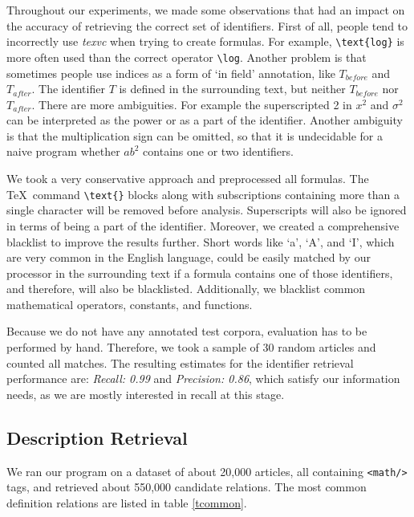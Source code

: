 \documentclass[runningheads]{llncs}
\begin{document}
Throughout our experiments, we made some observations that had an impact on the
accuracy of retrieving the correct set of identifiers. First of all, people
tend to incorrectly use \emph{texvc} when trying to create formulas. For example,
\texttt{\textbackslash text\{log\}} is more often used than the correct
operator \texttt{\textbackslash log}. Another problem is that sometimes people
use indices as a form of `in field' annotation, like $T_{before}$ and
$T_{after}$. The identifier $T$ is defined in the surrounding text, but
neither $T_{before}$ nor $T_{after}$. There are more ambiguities. For example
the superscripted 2 in $x^{2}$ and $\sigma^{2}$ can be interpreted as the
power or as a part of the identifier. Another ambiguity is that the
multiplication sign can be omitted, so that it is undecidable for a naive
program whether $ab^{2}$ contains one or two identifiers.

We took a very conservative approach and preprocessed all formulas.
The \TeX~command \texttt{\textbackslash text\{\}} blocks along with subscriptions containing
more than a single character will be removed before analysis. Superscripts
will also be ignored in terms of being a part of the identifier. Moreover, we
created a comprehensive blacklist to improve the results further. Short words
like `a', `A', and `I', which are very common in the English language, could be
easily matched by our processor in the surrounding text if a formula contains
one of those identifiers, and therefore, will also be blacklisted. Additionally,
we blacklist common mathematical operators, constants, and functions.

Because we do not have any annotated test corpora, evaluation has to be
performed by hand. Therefore, we took a sample of 30 random articles and
counted all matches. The resulting estimates for the identifier retrieval
performance are: \emph{Recall: 0.99} and \emph{Precision: 0.86}, which satisfy
our information needs, as we are mostly interested in recall at this stage.


\subsection{Description Retrieval}
We ran our program on a dataset of about 20,000 articles, all containing
\texttt{<math/>} tags, and retrieved about 550,000 candidate relations. The
most common definition relations are listed in table \ref{tcommon}.
\end{document}
